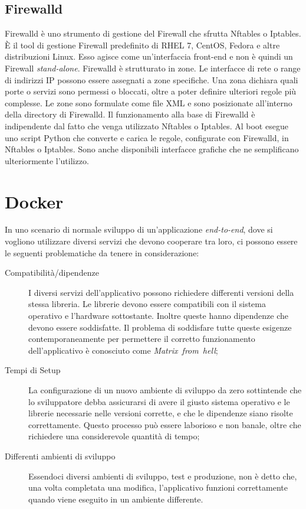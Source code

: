 \subsection{Firewalld}
\label{firewalld}
Firewalld \cite{firewalld} è uno strumento di gestione del Firewall che sfrutta  Nftables o Iptables. È il tool di gestione Firewall predefinito di RHEL 7, CentOS, Fedora e altre distribuzioni Linux. Esso agisce come  un'interfaccia front-end e non è quindi un Firewall \textit{stand-alone}.
Firewalld è strutturato in zone. Le interfacce di rete o range di indirizzi IP possono  essere assegnati a zone specifiche. Una zona  dichiara quali porte o servizi sono permessi o bloccati, oltre a poter definire ulteriori regole più complesse. Le zone sono formulate come file XML e sono posizionate all'interno della directory di Firewalld.
Il funzionamento alla base di Firewalld è indipendente dal fatto che venga utilizzato Nftables o Iptables. Al boot esegue uno script Python che converte e carica le regole, configurate con Firewalld, in Nftables o Iptables. Sono anche disponibili interfacce grafiche che ne semplificano ulteriormente l'utilizzo.

\section{Docker}
\label{docker}
In uno scenario di normale sviluppo di un'applicazione \textit{end-to-end}, dove si vogliono utilizzare diversi servizi che devono cooperare tra loro, ci possono essere le seguenti problematiche da tenere in considerazione:
\begin{description}
    \item[Compatibilità/dipendenze] I diversi servizi dell'applicativo possono richiedere differenti versioni della stessa libreria. Le librerie devono essere compatibili con il sistema operativo e l'hardware sottostante. Inoltre queste hanno dipendenze che devono essere soddisfatte.
    Il problema di soddisfare tutte queste esigenze contemporaneamente per permettere il corretto funzionamento dell'applicativo è conosciuto come \textit{Matrix~from~hell};
    \item[Tempi di Setup] La configurazione di un nuovo ambiente di sviluppo da zero sottintende che lo sviluppatore debba assicurarsi di avere il giusto sistema operativo e le librerie necessarie nelle versioni corrette, e che le dipendenze siano risolte correttamente. Questo processo può essere laborioso e non banale,  oltre che richiedere una considerevole quantità di tempo;
    \item[Differenti ambienti di sviluppo] Essendoci diversi ambienti di sviluppo, test e produzione, non è detto che, una volta completata una modifica,  l'applicativo funzioni correttamente quando viene eseguito in un ambiente differente.
\end{description}

